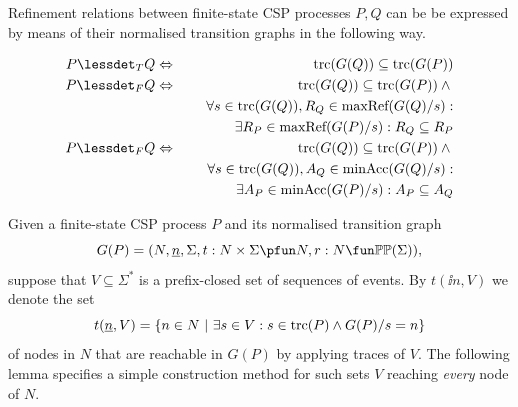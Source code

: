 Refinement relations between finite-state CSP processes $P, Q$ can be be
expressed by means of their normalised transition graphs in the following
way. 
%
\begin{lemma}
  \label{lemma:tgtrcref}
  \begin{eqnarray}
  P \lessdet_T Q & \Leftrightarrow & \trc(G(Q)) \subseteq\trc(G(P))
  \label{eq:trcrefa}
  \\
  \label{eq:failrefa}
  P \lessdet_F Q & \Leftrightarrow & \trc(G(Q)) \subseteq\trc(G(P)) \wedge {} \nonumber
  \\ & & \forall s\in\trc(G(Q)), R_Q\in\maxrefs(G(Q)/s):  \nonumber
  \\ & & \tabd
  \exists R_P\in\maxrefs(G(P)/s): R_Q\subseteq R_P
  \\
  \label{eq:failrefb}
  P \lessdet_F Q & \Leftrightarrow & \trc(G(Q)) \subseteq\trc(G(P)) \wedge {} \nonumber
  \\ & & \forall s\in\trc(G(Q)), A_Q\in\minaccs(G(Q)/s): \nonumber
  \\ & & \tabd
  \exists A_P\in\minaccs(G(P)/s): A_P\subseteq A_Q
  \end{eqnarray}
  \xbox
\end{lemma}
%


Given a finite-state CSP process $P$ and its normalised transition graph
\[
G(P) = ( N, \ii n, \Sigma, t : N\times\Sigma \pfun N, r : N \fun \mathbb{P}\mathbb{P}(\Sigma)),
\]
suppose that $V\subseteq\Sigma^*$ is a
prefix-closed set  of sequences of events. By $t(\ii n,V)$ we denote the set
\[
t(\underline{n},V) = \{ n\in N~|~\exists s\in V: s\in\text{trc}(P)\wedge G(P)/s = n \}
\]
of nodes in $N$ that are reachable in $G(P)$ by applying traces of $V$.
The following lemma specifies a simple construction method for such sets $V$ reaching 
{\it every} node of $N$.

